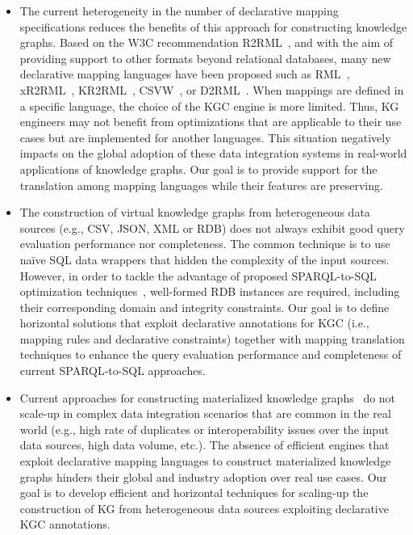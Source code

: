 \begin{itemize}
    \item The current heterogeneity in the number of declarative mapping specifications reduces the benefits of this approach for constructing knowledge graphs. Based on the W3C recommendation R2RML~\citep{R2RML}, and with the aim of providing support to other formats beyond relational databases, many new declarative mapping languages have been proposed such as RML~\citep{dimou2014rml}, xR2RML~\citep{michel2015translation}, KR2RML~\citep{slepicka2015kr2rml}, CSVW~\citep{tennison2015model}, or D2RML~\citep{chortaras2018mapping}. When mappings are defined in a specific language, the choice of the KGC engine is more limited. Thus, KG engineers may not benefit from optimizations that are applicable to their use cases but are implemented for another languages. This situation negatively impacts on the global adoption of these data integration systems in real-world applications of knowledge graphs. Our goal is to provide support for the translation among mapping languages while their features are preserving.

    \item The construction of virtual knowledge graphs from heterogeneous data sources (e.g., CSV, JSON, XML or RDB) does not always exhibit good query evaluation performance nor completeness. The common technique is to use na\"ive SQL data wrappers that hidden the complexity of the input sources. However, in order to tackle the advantage of proposed SPARQL-to-SQL optimization techniques~\citep{priyatna2014formalisation,calvanese2017ontop}, well-formed RDB instances are required, including their corresponding domain and integrity constraints. Our goal is to define horizontal solutions that exploit declarative annotations for KGC (i.e., mapping rules and declarative constraints) together with mapping translation techniques to enhance the query evaluation performance and completeness of current SPARQL-to-SQL approaches.

    \item Current approaches for constructing materialized knowledge graphs~\citep{csimcsek2019rocketrml,lefranccois2017sparql} do not scale-up in complex data integration scenarios that are common in the real world (e.g., high rate of duplicates or interoperability issues over the input data sources, high data volume, etc.). The absence of efficient engines that exploit declarative mapping languages to construct materialized knowledge graphs hinders their global and industry adoption over real use cases. Our goal is to develop efficient and horizontal techniques for scaling-up the construction of KG from heterogeneous data sources exploiting declarative KGC annotations.
\end{itemize}

